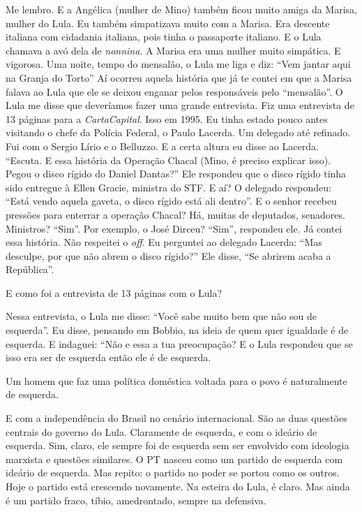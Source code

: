  Me lembro. E a Angélica (mulher de Mino) também ficou muito amiga da
Marisa, mulher do Lula. Eu também simpatizava muito com a Marisa. Era
descente italiana com cidadania italiana, pois tinha o passaporte
italiano. E o Lula chamava a avó dela de \emph{nonnina}. A Marisa era
uma mulher muito simpática. E vigorosa. Uma noite, tempo do mensalão, o
Lula me liga e diz: ``Vem jantar aqui na Granja do Torto'' Aí ocorreu
aquela história que já te contei em que a Marisa falava ao Lula que ele
se deixou enganar pelos responsáveis pelo ``mensalão''. O Lula me disse
que deveríamos fazer uma grande entrevista. Fiz uma entrevista de 13
páginas para a \emph{CartaCapital}. Isso em 1995. Eu tinha estado pouco
antes visitando o chefe da Polícia Federal, o Paulo Lacerda. Um delegado
até refinado. Fui com o Sergio Lírio e o Belluzzo. E a certa altura eu
disse ao Lacerda. ``Escuta. E essa história da Operação Chacal (Mino, é
preciso explicar isso). Pegou o disco rígido do Daniel Dantas?'' Ele
respondeu que o disco rígido tinha sido entregue à Ellen Gracie,
ministra do STF. E aí? O delegado respondeu: ``Está vendo aquela gaveta,
o disco rígido está ali dentro''. E o senhor recebeu pressões para
enterrar a operação Chacal? Há, muitas de deputados, senadores.
Ministros? ``Sim''. Por exemplo, o José Dirceu? ``Sim'', respondeu ele.
Já contei essa história. Não respeitei o \emph{off}. Eu perguntei ao
delegado Lacerda: ``Mas desculpe, por que não abrem o disco rígido?''
Ele disse, ``Se abrirem acaba a República''.

 E como foi a entrevista de 13 páginas com o Lula?

 Nessa entrevista, o Lula me disse: ``Você sabe muito bem que não sou
de esquerda''. Eu disse, pensando em Bobbio, na ideia de quem quer
igualdade é de esquerda. E indaguei: ``Não e essa a tua preocupação? E o
Lula respondeu que se isso era ser de esquerda então ele é de esquerda.

 Um homem que faz uma política doméstica voltada para o povo é
naturalmente de esquerda.

 E com a independência do Brasil no cenário internacional. São as duas
questões centrais do governo do Lula. Claramente de esquerda, e com o
ideário de esquerda. Sim, claro, ele sempre foi de esquerda sem ser
envolvido com ideologia marxista e questões similares. O PT nasceu como
um partido de esquerda com ideário de esquerda. Mas repito: o partido no
poder se portou como os outros. Hoje o partido está crescendo novamente.
Na esteira do Lula, é claro. Mas ainda é um partido fraco, tíbio,
amedrontado, sempre na defensiva.

